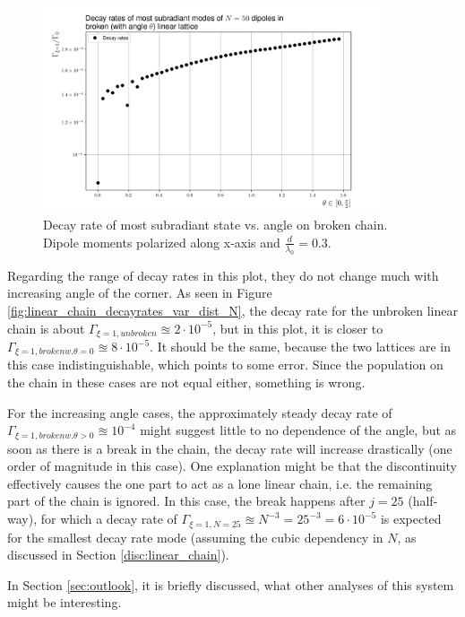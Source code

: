 \documentclass{article}
\begin{document}
\begin{figure}[H]
    \includegraphics[width=0.9\textwidth]{figs/case_linear_broken_rates.png}
    \caption{Decay rate of most subradiant state vs. angle on broken chain. Dipole moments polarized along x-axis and $\frac{d}{\lambda_0} = 0.3$. }
    \label{fig:linear_broken_rates}
\end{figure}
Regarding the range of decay rates in this plot, they do not change much with increasing angle of the corner. As seen in Figure \ref{fig:linear_chain_decayrates_var_dist_N}, the decay rate for the unbroken linear chain is about $\Gamma_{\xi=1, unbroken} \approxeq 2 \cdot 10^{-5}$, but in this plot, it is closer to $\Gamma_{\xi=1, broken w. \theta = 0} \approxeq 8 \cdot 10^{-5}$. It should be the same, because the two lattices are in this case indistinguishable, which points to some error. Since the population on the chain in these cases are not equal either, something is wrong. 

For the increasing angle cases, the approximately steady decay rate of $\Gamma_{\xi = 1, broken w. \theta > 0} \approxeq 10^{-4}$ might suggest little to no dependence of the angle, but as soon as there is a break in the chain, the decay rate will increase drastically (one order of magnitude in this case). One explanation might be that the discontinuity effectively causes the one part to act as a lone linear chain, i.e. the remaining part of the chain is ignored. In this case, the break happens after $j=25$ (half-way), for which a decay rate of $\Gamma_{\xi=1, N=25} \approxeq N^{-3} = 25^{-3} = 6 \cdot 10^{-5}$ is expected for the smallest decay rate mode (assuming the cubic dependency in $N$, as discussed in Section \ref{disc:linear_chain}). 

In Section \ref{sec:outlook}, it is briefly discussed, what other analyses of this system might be interesting. 
\end{document}
